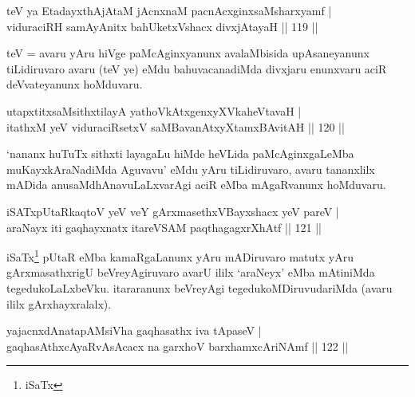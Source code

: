 


\begin{shl}
teV ya EtadayxthAjAtaM jAcnxnaM pacnAcxginxsaMsharxyamf | \\
viduraciRH samAyAnitx bahUketxVshacx divxjAtayaH \hfill|| 119 || 
\end{shl}

\begin{artha}
teV = avaru yAru hiVge paMcAginxyanunx avalaMbisida upAsaneyanunx
tiLidiruvaro avaru (teV ye) eMdu bahuvacanadiMda divxjaru enunxvaru
aciR deVvateyanunx hoMduvaru.
\end{artha}

\begin{shl}
utapxtitxsaMsithxtilayA yathoVkAtxgenxyXVkaheVtavaH | \\
itathxM yeV viduraciRsetxV saMBavanAtxyXtamxBAvitAH \hfill|| 120 || 
\end{shl}

\begin{artha}
`nananx huTuTx sithxti layagaLu hiMde heVLida paMcAginxgaLeMba
muKayxkAraNadiMda Aguvavu' eMdu yAru tiLidiruvaro, avaru tananxlilx
mADida anusaMdhAnavuLaLxvarAgi aciR eMba mAgaRvanunx hoMduvaru.
\end{artha}


\begin{shl}
iSATxpUtaRkaqtoV yeV veY gArxmasethxVBayxshacx yeV pareV | \\
araNayx iti gaqhayxnatx itareVSAM paqthagagxrXhAtf \hfill|| 121 || 
\end{shl}

\begin{artha}
iSaTx\footnote{iSaTx} pUtaR eMba kamaRgaLanunx yAru mADiruvaro
matutx yAru gArxmasathxrigU beVreyAgiruvaro avarU ililx `araNeyx' eMba
mAtiniMda tegedukoLaLxbeVku. itararanunx beVreyAgi
tegedukoMDiruvudariMda (avaru ililx gArxhayxralalx).
\end{artha}


\begin{shl}
yajacnxdAnatapAMsiVha gaqhasathx iva tApaseV | \\
gaqhasAthxcAyaRvAsAcacx na garxhoV barxhamxcAriNAmf \hfill|| 122 || 
\end{shl}

